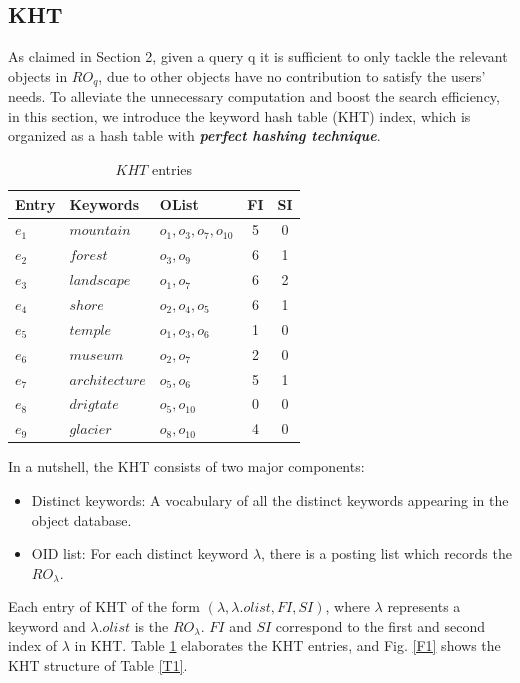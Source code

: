 \subsection{KHT}
As claimed in Section 2, given a query q it is sufficient to only tackle the relevant objects in $RO_q$, due to other objects have no contribution to satisfy the users' needs. To alleviate the unnecessary computation and boost the search efficiency, in this section, we introduce the keyword hash table (KHT) index, which is organized as a hash table with \textbf{\textit{perfect hashing technique}}.
\begin{table}
\centering
\begin{tabular}{|l|l|l|c|c|}
\hline
Entry &Keywords & OList & FI & SI \\
\hline \hline
$e_1$ &$mountain$ & $o_1,o_3,o_7,o_{10}$ & 5 & 0\\
\hline
$e_2$ &$forest$ & $o_3,o_9$ & 6 & 1 \\
\hline
$e_3$ &$landscape$ & $o_1,o_7$ & 6 & 2 \\
\hline
$e_4$ &$shore$ & $o_2,o_4,o_5$ & 6 & 1 \\
\hline
$e_5$ &$temple$ & $o_1,o_3,o_6$ & 1 & 0 \\
\hline
$e_6$ &$museum$ & $o_2,o_7$ & 2 & 0 \\
\hline
$e_7$ &$architecture$ & $o_5,o_6$ & 5 & 1 \\
\hline
$e_8$ &$drigtate$ & $o_5,o_{10}$ & 0 & 0 \\
\hline
$e_9$ &$glacier$ & $o_8,o_{10}$ & 4 & 0 \\
\hline
\end{tabular}
\caption{$KHT$ entries}\label{T4}
\end{table}

In a nutshell, the KHT consists of two major components:
\begin{itemize}
    \item Distinct keywords: A vocabulary of all the distinct keywords appearing in the object database.
    \item OID list: For each distinct keyword $\lambda$, there is a posting list which records the $RO_\lambda$.
\end{itemize}

Each entry of KHT of the form $(\lambda,\lambda.olist, FI, SI)$, where $\lambda$ represents a keyword and $\lambda.olist$ is the $RO_\lambda$. $FI$ and $SI$ correspond to the first and second index of $\lambda$ in KHT. Table \ref{T4} elaborates the KHT entries, and Fig. \ref{F1} shows the KHT structure of Table \ref{T1}.

